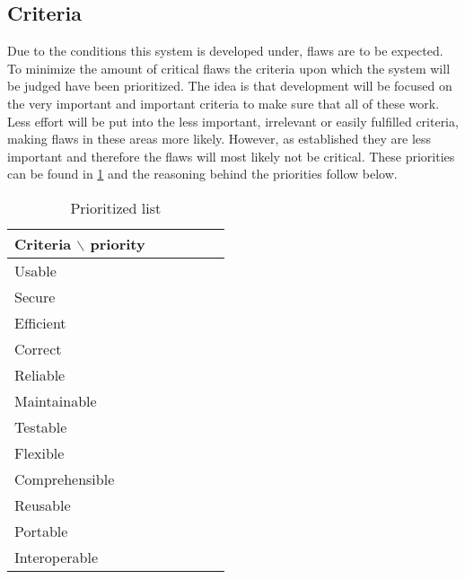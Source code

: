 \subsection{Criteria}
Due to the conditions this system is developed under, flaws are to be expected.
To minimize the amount of critical flaws the criteria \citep[p.~180]{Rod-Aalborg} upon which the system will be judged have been prioritized.
The idea is that development will be focused on the very important and important criteria to make sure that all of these work.
Less effort will be put into the less important, irrelevant or easily fulfilled criteria, making flaws in these areas more likely.
However, as established they are less important and therefore the flaws will most likely not be critical.
These priorities can be found in \cref{fig:criteria} and the reasoning behind the priorities follow below.



\begin{table}[H]
	\begin{center}
		\begin{tabular}{|l|c|c|c|c|c|}
			\hline
			Criteria $\backslash$ priority & \rotatebox{90}{Very important} &  \rotatebox{90}{Important} & \rotatebox{90}{Less important} & \rotatebox{90}{Irrelevant} & \rotatebox{90}{Easily fulfilled}\\
			\hline
			Usable & \xmark & & & & \\
			\hline
			Secure & & & & \xmark & \\
			\hline
			Efficient & & & & & \xmark \\
			\hline
			Correct & & \xmark & & & \\
			\hline
			Reliable & \xmark & & & & \\
			\hline
			Maintainable & & & \xmark & & \\
			\hline
			Testable & & \xmark & & & \\
			\hline
			Flexible & & & & \xmark & \\
			\hline
			Comprehensible & & \xmark & & & \\
			\hline
			Reusable & & & \xmark & & \\
			\hline
			Portable & & & & \xmark & \\
			\hline
			Interoperable & & & & \xmark & \\
			\hline
		\end{tabular}
	\end{center}
	\caption{Prioritized list}\label{fig:criteria}
\end{table}


